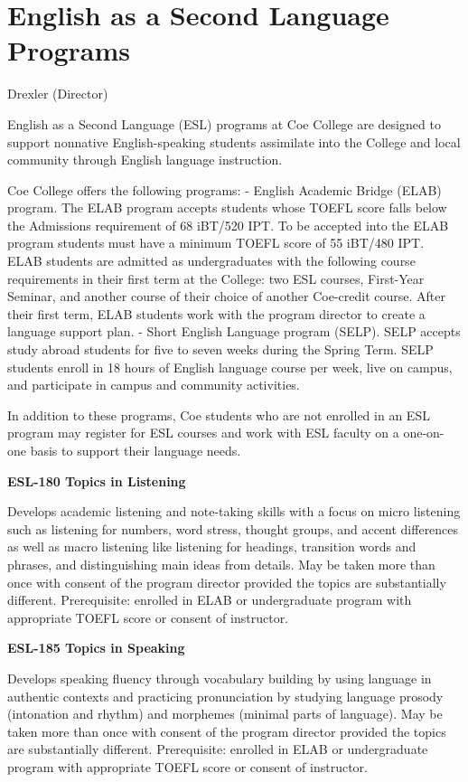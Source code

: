 \documentclass[
  letterpaper,
]{scrbook}
\begin{document}
\section{English as a Second Language
Programs}\label{english-as-a-second-language-programs}

Drexler (Director)

English as a Second Language (ESL) programs at Coe College are designed
to support nonnative English-speaking students assimilate into the
College and local community through English language instruction.

Coe College offers the following programs: - English Academic Bridge
(ELAB) program. The ELAB program accepts students whose TOEFL score
falls below the Admissions requirement of 68 iBT/520 IPT. To be accepted
into the ELAB program students must have a minimum TOEFL score of 55
iBT/480 IPT. ELAB students are admitted as undergraduates with the
following course requirements in their first term at the College: two
ESL courses, First-Year Seminar, and another course of their choice of
another Coe-credit course. After their first term, ELAB students work
with the program director to create a language support plan. - Short
English Language program (SELP). SELP accepts study abroad students for
five to seven weeks during the Spring Term. SELP students enroll in 18
hours of English language course per week, live on campus, and
participate in campus and community activities.

In addition to these programs, Coe students who are not enrolled in an
ESL program may register for ESL courses and work with ESL faculty on a
one-on-one basis to support their language needs.

\textbf{ESL-180 Topics in Listening}

Develops academic listening and note-taking skills with a focus on micro
listening such as listening for numbers, word stress, thought groups,
and accent differences as well as macro listening like listening for
headings, transition words and phrases, and distinguishing main ideas
from details. May be taken more than once with consent of the program
director provided the topics are substantially different. Prerequisite:
enrolled in ELAB or undergraduate program with appropriate TOEFL score
or consent of instructor.

\textbf{ESL-185 Topics in Speaking}

Develops speaking fluency through vocabulary building by using language
in authentic contexts and practicing pronunciation by studying language
prosody (intonation and rhythm) and morphemes (minimal parts of
language). May be taken more than once with consent of the program
director provided the topics are substantially different. Prerequisite:
enrolled in ELAB or undergraduate program with appropriate TOEFL score
or consent of instructor.
\end{document}
